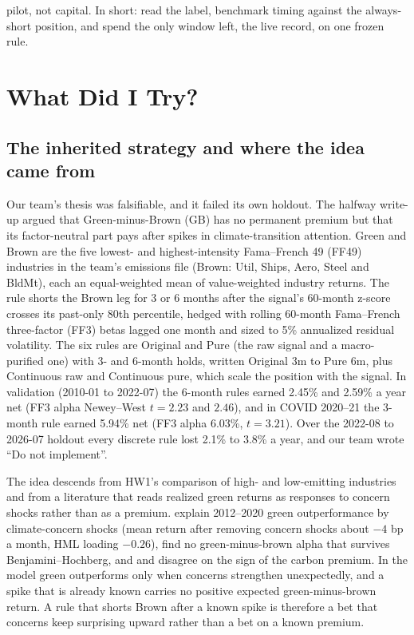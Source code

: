 pilot, not capital. In short: read the label, benchmark timing against the always-short position, and spend the only window left, the live record, on one frozen rule.

\clearpage
\section{What Did I Try?}
\label{sec:try}

\subsection{The inherited strategy and where the idea came from}
\label{sec:idea}

Our team's thesis was falsifiable, and it failed its own holdout. The halfway write-up argued that Green-minus-Brown (GB) has no permanent premium but that its factor-neutral part pays after spikes in climate-transition attention. Green and Brown are the five lowest- and highest-intensity Fama--French 49 (FF49) industries in the team's emissions file (Brown: Util, Ships, Aero, Steel and BldMt), each an equal-weighted mean of value-weighted industry returns. The rule shorts the Brown leg for 3 or 6 months after the signal's 60-month z-score crosses its past-only 80th percentile, hedged with rolling 60-month Fama--French three-factor (FF3) betas lagged one month and sized to 5\% annualized residual volatility. The six rules are Original and Pure (the raw signal and a macro-purified one) with 3- and 6-month holds, written Original 3m to Pure 6m, plus Continuous raw and Continuous pure, which scale the position with the signal. In validation (2010-01 to 2022-07) the 6-month rules earned 2.45\% and 2.59\% a year net (FF3 alpha Newey--West $t=2.23$ and $2.46$), and in COVID 2020--21 the 3-month rule earned 5.94\% net (FF3 alpha 6.03\%, $t=3.21$). Over the 2022-08 to 2026-07 holdout every discrete rule lost 2.1\% to 3.8\% a year, and our team wrote ``Do not implement''.

The idea descends from HW1's comparison of high- and low-emitting industries and from a literature that reads realized green returns as responses to concern shocks rather than as a premium. \citet{pst2022} explain 2012--2020 green outperformance by climate-concern shocks (mean return after removing concern shocks about $-4$ bp a month, HML loading $-0.26$), \citet{eijp2026} find no green-minus-brown alpha that survives Benjamini--Hochberg, and \citet{bk2021} and \citet{zhang2025} disagree on the sign of the carbon premium. In the \citet{pst2021} model green outperforms only when concerns strengthen unexpectedly, and a spike that is already known carries no positive expected green-minus-brown return. A rule that shorts Brown after a known spike is therefore a bet that concerns keep surprising upward rather than a bet on a known premium.

